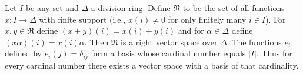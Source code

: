 Let $I$ be any set and $\Delta$ a division ring. Define $\mathfrak{R}$ to be the set of all functions $x: I \to \Delta$ with finite support (i.e., $x(i) \neq 0$ for only finitely many $i \in I$). For $x, y \in \mathfrak{R}$ define $(x + y)(i) = x(i) + y(i)$ and for $\alpha \in \Delta$ define $(x\alpha)(i) = x(i)\alpha$. Then $\mathfrak{R}$ is a right vector space over $\Delta$. The functions $e_i$ defined by $e_i(j) = \delta_{ij}$ form a basis whose cardinal number equals $|I|$. Thus for every cardinal number there exists a vector space with a basis of that cardinality.
